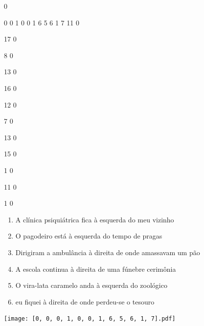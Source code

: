 \documentclass[12pt]{article}
\begin{document}
		\vfill  
		  
{
	0	%

	0	%
	0	%
	1	%
	0	%
	0	%
	1	%
	6	%
	5	%
	6	%
	1	%
	7	%
	11	%
	0	%

	17	%
	0	%

	8	%
	0	%

	13	%
	0	%

	16	%
	0	%

	12	%
	0	%

	7	%
	0	%

	13	%
	0	%

	15	%
	0	%

	1	%
	0	%

	11	%
	0	%

	1	%
	0	%

}	  
		    	

		 

\pagebreak


	\begin{enumerate}
		  \sffamily %
		  \large %


\vfill \item
A clínica psiquiátrica fica	%
à esquerda
do meu vizinho	%

\vfill \item
O pagodeiro está	%
à esquerda
do tempo de pragas	%

\vfill \item
Dirigiram a ambulância	%
à direita
de onde amassavam um pão	%

\vfill \item
A escola continua	%
à direita
de uma fúnebre cerimônia	%

\vfill \item
O vira-lata caramelo anda	%
à esquerda
do zoológico	%

\vfill \item
eu fiquei	%
à direita
de onde perdeu-se o tesouro	%
	\end{enumerate}
		  
		  \hfill

		  \vfill

\texttt{[image: [0, 0, 0, 1, 0, 0, 1, 6, 5, 6, 1, 7].pdf]}
\end{document}
